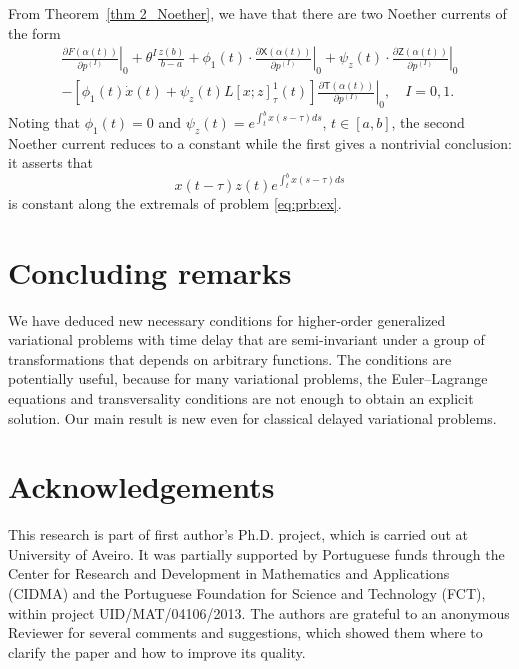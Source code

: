 \documentclass{my-aims}
\theoremstyle{definition}
\begin{document}
From Theorem~\ref{thm 2_Noether}, we have that there are two Noether currents of the form
\begin{multline*}
\left.\frac{\partial F(\alpha(t))}{\partial p^{(I)}}\right|_0+\theta^I\frac{z(b)}{b-a}
+\phi_1(t)\cdot \left. \frac{\partial \mathsf{X}(\alpha(t))}{\partial p^{(I)}}\right|_0
+\psi_z(t)\cdot \left. \frac{\partial \mathsf{Z}(\alpha(t))}{\partial p^{(I)}}\right|_0\\
-\left.	\left[\phi_1(t)\dot{x}(t)+\psi_z(t)L[x;z]_\tau^1(t)\right]
\frac{\partial \mathsf{T}(\alpha(t))}{\partial p^{(I)}}\right|_0, \quad I=0,1.
\end{multline*}
Noting that $\phi_1(t)=0$ and $\psi_z(t)=e^{\int_t^b x(s-\tau) ds}$, $t\in [a,b]$, 
the second Noether current reduces to a constant 
while the first gives a nontrivial conclusion: it asserts that
\begin{equation*}
x(t-\tau) z(t) e^{\int_t^b x(s-\tau) ds} 
\end{equation*}
is constant along the extremals of problem \eqref{eq:prb:ex}.


\section{Concluding remarks}
\label{sec:conc}

We have deduced new necessary conditions for higher-order generalized 
variational problems with time delay that are semi-invariant under 
a group of transformations that depends on arbitrary functions. 
The conditions are potentially useful, because for many variational problems, 
the Euler--Lagrange equations and transversality conditions are not enough 
to obtain an explicit solution. Our main result is new even 
for classical delayed variational problems.


\section*{Acknowledgements}

This research is part of first author's Ph.D. project,
which is carried out at University of Aveiro.
It was partially supported by Portuguese funds through
the Center for Research and Development in Mathematics
and Applications (CIDMA) and the Portuguese Foundation
for Science and Technology (FCT), within project 
UID/MAT/04106/2013. The authors are grateful to an 
anonymous Reviewer for several comments and suggestions, 
which showed them where to clarify the paper 
and how to improve its quality.
\end{document}

